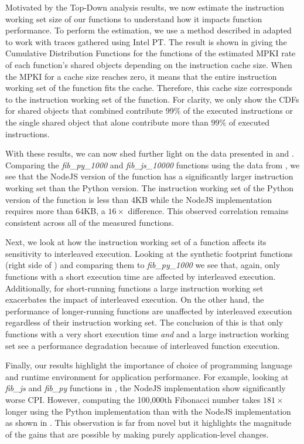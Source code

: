\label{wosc:subsec:footprint}

Motivated by the Top-Down analysis results, we now estimate the instruction working set size of our functions to understand how it impacts function performance. To perform the estimation, we use a method described in  \cite{splash2} adapted to work with traces gathered using Intel PT. The result is shown in  giving the Cumulative Distribution Functions for the functions of the estimated MPKI rate of each function's shared objects depending on the instruction cache size. When the MPKI for a cache size reaches zero, it means that the entire instruction working set of the function fits the cache. Therefore, this cache size corresponds to the instruction working set of the function. For clarity, we only show the CDFs for shared objects that combined contribute 99\% of the executed instructions or the single shared object that alone contribute more than 99\% of executed instructions.


With these results, we can now shed further light on the data presented in  and . Comparing the \emph{fib\_py\_1000} and \emph{fib\_js\_10000} functions using the data from  , we see that the NodeJS version of the function has a significantly larger instruction working set than the Python version. The instruction working set of the Python version of the function is less than 4KB while the NodeJS implementation requires more than 64KB, a $16\times$ difference. This observed correlation remains consistent across all of the measured functions.


Next, we look at how the instruction working set of a function affects its sensitivity to interleaved execution. Looking at the synthetic footprint functions (right side of ) and comparing them to \emph{fib\_py\_1000} we see that, again, only functions with a short execution time are affected by interleaved execution. Additionally, for short-running functions a large instruction working set exacerbates the impact of interleaved execution. On the other hand, the performance of longer-running functions are unaffected by interleaved execution regardless of their instruction working set. The conclusion of this is that only functions with a very short execution time \emph{and} and a large instruction working set see a performance degradation because of interleaved function execution.


Finally, our results highlight the importance of choice of programming language and runtime environment for application performance.  For example, looking at \emph{fib\_js} and \emph{fib\_py} functions in , the NodeJS implementation show significantly worse CPI. However, computing the 100,000th Fibonacci number takes $181\times$ longer using the Python implementation than with the NodeJS implementation as shown in . This observation is far from novel but it highlights the magnitude of the gains that are possible by making purely application-level changes.


